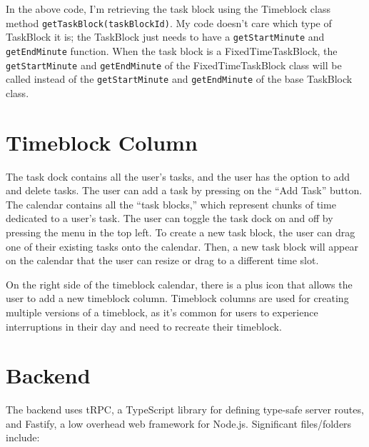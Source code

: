 \documentclass[notitlepage, 12pt]{report}
\newcommand{\code}[1]{\texttt{#1}}
\begin{document}
\begin{sloppypar}
	In the above code, I'm retrieving the task block using the Timeblock class method \code{getTaskBlock(taskBlockId)}. My code doesn't care which type of TaskBlock it is; the TaskBlock just needs to have a \code{getStartMinute} and \code{getEndMinute} function. When the task block is a FixedTimeTaskBlock, the \code{getStartMinute} and \code{getEndMinute} of the FixedTimeTaskBlock class will be called instead of the \code{getStartMinute} and \code{getEndMinute} of the base TaskBlock class.
\end{sloppypar}

\section*{Timeblock Column}


The task dock contains all the user's tasks, and the user has the option to add and delete tasks. The user can add a task by pressing on the ``Add Task'' button. The calendar contains all the ``task blocks,'' which represent chunks of time dedicated to a user's task. The user can toggle the task dock on and off by pressing the menu in the top left. To create a new task block, the user can drag one of their existing tasks onto the calendar. Then, a new task block will appear on the calendar that the user can resize or drag to a different time slot.

On the right side of the timeblock calendar, there is a plus icon that allows the user to add a new timeblock column. Timeblock columns are used for creating multiple versions of a timeblock, as it's common for users to experience interruptions in their day and need to recreate their timeblock.

\section*{Backend}
The backend uses tRPC, a TypeScript library for defining type-safe server routes, and Fastify, a low overhead web framework for Node.js. Significant files/folders include:
\end{document}
